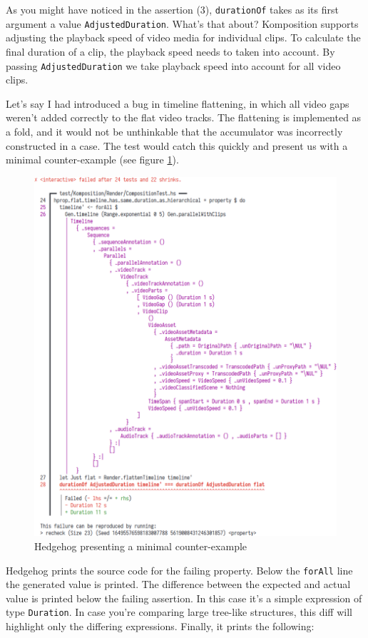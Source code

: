 As you might have noticed in the assertion (3), \texttt{durationOf} takes as its first argument a value \texttt{AdjustedDuration}. What's that about? Komposition supports adjusting the playback speed of video media for individual clips. To calculate the final duration of a clip, the playback speed needs to taken into account. By passing \texttt{AdjustedDuration} we take playback speed into account for all video clips.

Let's say I had introduced a bug in timeline flattening, in which all video gaps weren't added correctly to the flat video tracks. The flattening is implemented as a fold, and it would not be unthinkable that the accumulator was incorrectly constructed in a case. The test would catch this quickly and present us with a minimal counter-example (see figure \ref{fig:case1_7}).
\begin{figure}[htbp]
 \centering
 \includegraphics[width=.95\linewidth]{./pics/case1_7.png}
 \caption{Hedgehog presenting a minimal counter-example}
 \label{fig:case1_7}
\end{figure}

Hedgehog prints the source code for the failing property. Below the \texttt{forAll} line the generated value is printed. The difference between the expected and actual value is printed below the failing assertion. In this case it's a simple expression of type \texttt{Duration}. In case you're comparing large tree-like structures, this diff will highlight only the differing expressions. Finally, it prints the following:


